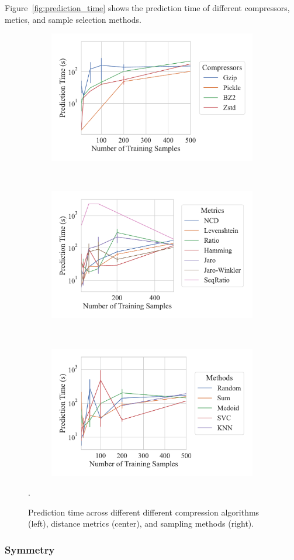 \documentclass[sigconf]{acmart}
\begin{document}
Figure~\ref{fig:prediction_time} shows the prediction time of different compressors, metics, and sample selection methods.
\begin{figure}
	\begin{subfigure}
		\centering
		\includegraphics[width=.32\textwidth]{figs/kdd_nsl/compressor_vs_predict_time.pdf}
	\end{subfigure}%
	~
	\begin{subfigure}
		\centering
		\includegraphics[width=.32\textwidth]{figs/kdd_nsl/metric_vs_predict_time.pdf}
	\end{subfigure}
	~
	\begin{subfigure}
		\centering
		\includegraphics[width=.32\textwidth]{figs/kdd_nsl/method_vs_predict_time.pdf}
	\end{subfigure}
	\caption{Prediction time across different different compression algorithms (left), distance metrics (center), and sampling methods (right).}.
	\label{fig:prediction_time_kdd}
\end{figure}

\subsubsection{Symmetry}
\end{document}
